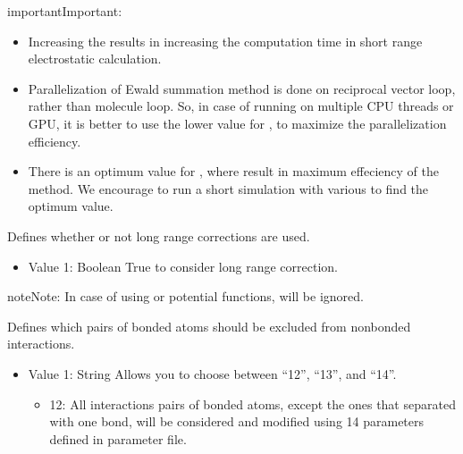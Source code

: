 \documentclass[letterpaper,10pt,english]{sphinxmanual}
\begin{document}
\begin{description}
\begin{sphinxadmonition}{important}{Important:}
\begin{itemize}
\item {} 
Increasing the  results in increasing the computation time in short range electrostatic calculation.

\item {} 
Parallelization of Ewald summation method is done on reciprocal vector loop, rather than molecule loop.
So, in case of running on multiple CPU threads or GPU, it is better to use the lower value for , to maximize the parallelization efficiency.

\item {} 
There is an optimum value for , where result in maximum effeciency of the method. We encourage to run a short simulation with various  to find the optimum value.

\end{itemize}
\end{sphinxadmonition}

\item[{\sphinxcode{\sphinxupquote{LRC}}}] \leavevmode
Defines whether or not long range corrections are used.
\begin{itemize}
\item {} 
Value 1: Boolean \sphinxhyphen{} True to consider long range correction.

\end{itemize}

\begin{sphinxadmonition}{note}{Note:}
In case of using  or  potential functions,  will be ignored.
\end{sphinxadmonition}

\item[{\sphinxcode{\sphinxupquote{Exclude}}}] \leavevmode
Defines which pairs of bonded atoms should be excluded from non\sphinxhyphen{}bonded interactions.
\begin{itemize}
\item {} 
Value 1: String \sphinxhyphen{} Allows you to choose between “1\sphinxhyphen{}2”, “1\sphinxhyphen{}3”, and “1\sphinxhyphen{}4”.
\begin{itemize}
\item {} 
1\sphinxhyphen{}2: All interactions pairs of bonded atoms, except the ones that separated with one bond, will be considered and modified using 1\sphinxhyphen{}4 parameters defined in parameter file.


\end{itemize}
\end{itemize}
\end{description}
\end{document}
